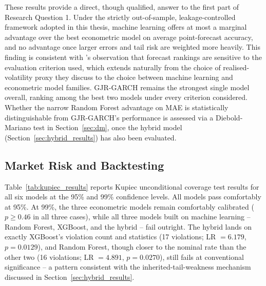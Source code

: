 \documentclass[12pt,a4paper]{article}
\begin{document}
These results provide a direct, though qualified, answer to the first part of Research Question 1.
Under the strictly out-of-sample, leakage-controlled framework adopted in this thesis, machine
learning offers at most a marginal advantage over the best econometric model on average
point-forecast accuracy, and no advantage once larger errors and tail risk are weighted more
heavily. This finding is consistent with \citet{poon2003}'s observation that forecast rankings are
sensitive to the evaluation criterion used, which extends naturally from the choice of
realised-volatility proxy they discuss to the choice between machine learning and econometric model
families. GJR-GARCH remains the strongest single model overall, ranking among the best two models
under every criterion considered. Whether the narrow Random Forest advantage on MAE is statistically
distinguishable from GJR-GARCH's performance is assessed via a Diebold-Mariano test in
Section~\ref{sec:dm}, once the hybrid model (Section~\ref{sec:hybrid_results}) has also been
evaluated.

\subsection{Market Risk and Backtesting}\label{sec:market_risk_results}
Table~\ref{tab:kupiec_results} reports Kupiec unconditional coverage test results for all six
models at the 95\% and 99\% confidence levels. All models pass comfortably at 95\%. At 99\%, the
three econometric models remain comfortably calibrated ($p \geq 0.46$ in all three cases), while
all three models built on machine learning -- Random Forest, XGBoost, and the hybrid -- fail
outright. The hybrid lands on exactly XGBoost's violation count and statistics (17 violations; LR
$=6.179$, $p=0.0129$), and Random Forest, though closer to the nominal rate than the other two (16
violations; LR $=4.891$, $p=0.0270$), still fails at conventional significance -- a pattern
consistent with the inherited-tail-weakness mechanism discussed in Section~\ref{sec:hybrid_results}.
\end{document}
